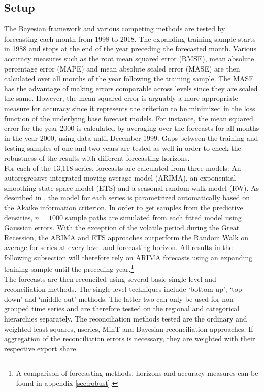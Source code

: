 \documentclass[a4paper,fleqn,11pt]{article}
\begin{document}
\subsection{Setup}
The Bayesian framework and various competing methods are tested by forecasting each month from 1998 to 2018. The expanding training sample starts in 1988 and stops at the end of the year preceding the forecasted month. Various accuracy measures such as the root mean squared error (RMSE), mean absolute percentage error (MAPE) and mean absolute scaled error (MASE) are then calculated over all months of the year following the training sample. The MASE has the advantage of making errors comparable across levels since they are scaled the same. However, the mean squared error is arguably a more appropriate measure for accuracy since it represents the criterion to be minimized in the loss function of the underlying base forecast models. For instance, the mean squared error for the year 2000 is calculated by averaging over the forecasts for all months in the year 2000, using data until December 1999. Gaps between the training and testing samples of one and two years are tested as well in order to check the robustness of the results with different forecasting horizons.\\

For each of the 13,118 series, forecasts are calculated from three models: An autoregressive integrated moving average model (ARIMA), an exponential smoothing state space model (ETS) and a seasonal random walk model (RW). As described in \cite{Hyndman2008}, the model for each series is parametrized automatically based on the Akaike information criterion. In order to get samples from the predictive densities, $n = 1000$ sample paths are simulated from each fitted model using Gaussian errors. With the exception of the volatile period during the Great Recession, the ARIMA and ETS approaches outperform the Random Walk on average for series at every level and forecasting horizon. All results in the following subsection will therefore rely on ARIMA forecasts using an expanding training sample until the preceding year.\footnote{A comparison of forecasting methods, horizons and accuracy measures can be found in appendix \ref{sec:robust}.}\\

The forecasts are then reconciled using several basic single-level and reconciliation methods. The single-level techniques include `bottom-up', `top-down' and `middle-out' methods. The latter two can only be used for non-grouped time series and are therefore tested on the regional and categorical hierarchies separately. The reconciliation methods tested are the ordinary and weighted least squares, nseries, MinT and Bayesian reconciliation approaches. If aggregation of the reconciliation errors is necessary, they are weighted with their respective export share.\\
\end{document}
